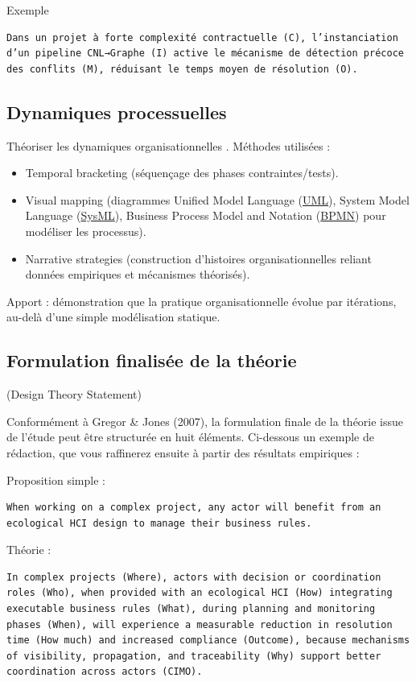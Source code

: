\documentclass[a4paper,12pt]{article}
\begin{document}
Exemple
\begin{verbatim}
Dans un projet à forte complexité contractuelle (C), l’instanciation d’un pipeline CNL→Graphe (I) active le mécanisme de détection précoce des conflits (M), réduisant le temps moyen de résolution (O).
\end{verbatim}
\subsection{Dynamiques processuelles}
\label{sec:orgb86dfee}
Théoriser les dynamiques organisationnelles \autocite[(1999)]{Langley}.
Méthodes utilisées :
\begin{itemize}
\item Temporal bracketing (séquençage des phases contraintes/tests).
\item Visual mapping (diagrammes Unified Model Language
 (\protect\hyperlink{gls-2}{\label{gls-2-use-1}UML}), System Model Language
 (\protect\hyperlink{gls-3}{\label{gls-3-use-1}SysML}), Business Process Model and Notation
 (\protect\hyperlink{gls-4}{\label{gls-4-use-1}BPMN}) pour modéliser les processus).
\item Narrative strategies (construction d’histoires organisationnelles reliant données empiriques et mécanismes théorisés).
\end{itemize}

Apport : démonstration que la pratique organisationnelle évolue par itérations, au-delà d’une simple modélisation statique.
\subsection{Formulation finalisée de la théorie}
\label{sec:org6ab1a2e}
(Design Theory Statement)

Conformément à Gregor \& Jones (2007), la formulation finale de la théorie issue de l’étude peut être structurée en huit éléments. Ci-dessous un exemple de rédaction, que vous raffinerez ensuite à partir des résultats empiriques :

Proposition simple :
\begin{verbatim}
When working on a complex project, any actor will benefit from an ecological HCI design to manage their business rules.
\end{verbatim}

Théorie :
\begin{verbatim}
In complex projects (Where), actors with decision or coordination roles (Who), when provided with an ecological HCI (How) integrating executable business rules (What), during planning and monitoring phases (When), will experience a measurable reduction in resolution time (How much) and increased compliance (Outcome), because mechanisms of visibility, propagation, and traceability (Why) support better coordination across actors (CIMO).
\end{verbatim}
\end{document}
